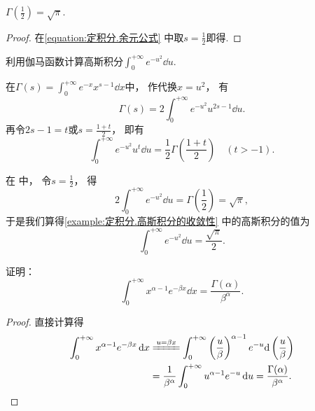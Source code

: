 \begin{corollary}
\(\Gamma\left(\frac{1}{2}\right) = \sqrt{\pi}\).
\begin{proof}
在\cref{equation:定积分.余元公式} 中取\(s = \frac12\)即得.
\end{proof}
\end{corollary}

\begin{example}
利用伽马函数计算高斯积分\(\int_0^{+\infty} e^{-u^2} \dd{u}\).
\begin{solution}
在\(\Gamma(s) = \int_0^{+\infty} e^{-x} x^{s-1} \dd{x}\)中，
作代换\(x = u^2\)，
有\begin{equation}\label{equation:定积分.伽马函数.中间步骤1}
	\Gamma(s) = 2 \int_0^{+\infty} e^{-u^2} u^{2s-1} \dd{u}.
\end{equation}
再令\(2s-1 = t\)或\(s = \frac{1+t}{2}\)，
即有\begin{equation}
	\int_0^{+\infty} e^{-u^2} u^t \dd{u}
	= \frac{1}{2} \Gamma\left(\frac{1+t}{2}\right)
	\quad (t > -1).
\end{equation}

在  中，
令\(s=\frac12\)，
得\[
	2\int_0^{+\infty} e^{-u^2} \dd{u}
	= \Gamma\left(\frac{1}{2}\right)
	= \sqrt{\pi},
\]
于是我们算得\cref{example:定积分.高斯积分的收敛性} 中的高斯积分的值为\begin{equation}
	\int_0^{+\infty} e^{-u^2} \dd{u} = \frac{\sqrt{\pi}}{2}.
\end{equation}
\end{solution}
\end{example}

\begin{example}
证明：\begin{equation}
	\int_0^{+\infty} x^{\alpha-1} e^{-\beta x} \dd{x}
	= \frac{\Gamma(\alpha)}{\beta^\alpha}.
\end{equation}
\begin{proof}
直接计算得
\begin{align*}
	\int_0^{+\infty} x^{\alpha-1} e^{-\beta x} \dd{x}
	&\xlongequal{u=\beta x}
		\int_0^{+\infty}
			\left(\frac{u}{\beta}\right)^{\alpha-1}
			e^{-u} \dd\left(\frac{u}{\beta}\right) \\
	&= \frac{1}{\beta^\alpha} \int_0^{+\infty} u^{\alpha-1} e^{-u} \dd{u}
	= \frac{\Gamma(\alpha)}{\beta^\alpha}.
	\qedhere
\end{align*}
\end{proof}
\end{example}

